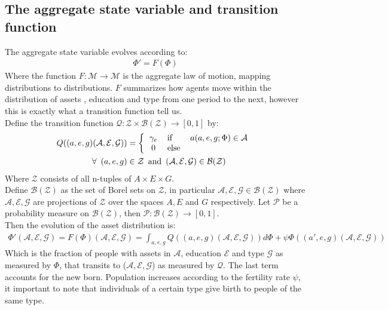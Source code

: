  \subsection*{The aggregate state variable and transition function}
\noindent The aggregate state variable evolves according to:
\begin{align}
\Phi'=F(\Phi)
\end{align} 
Where the function $F:\mathcal{M}\to\mathcal{M}$ is the aggregate law of motion, mapping distributions to distributions. $F$ summarizes how agents move within the distribution of assets , education and type from one period to the next, however this is exactly what a transition function tell us. \\
\noindent Define the transition function $\mathcal{Q}:\mathcal{Z}\times\mathcal{B(Z)}\to[0,1]$ by: 
\begin{align*}
Q((a,e,g)(\mathcal{A},\mathcal{E},\mathcal{G})) &= \left\{
\begin{tabular}{clc}
$\gamma_{e}$ & if      & $a(a,e,g;\Phi) \in \mathcal{A} $\\
0 & else & 
\end{tabular}
\right.\\
\forall \,\,\,(a,e,g)&\in\mathcal{Z}\,\,\,\mbox{and}\,\,\,(\mathcal{A,E,G})\in{\mathcal{B(Z)}}
\end{align*}
Where $\mathcal{Z}$ consists of all n-tuples of $A\times E\times G$. \\
Define $\mathcal{B(Z)}$ as the set of Borel sets on $\mathcal{Z}$, in particular $\mathcal{A,E,G}\in\mathcal{B(Z)}$ where $\mathcal{A,E,G}$ are projections of $\mathcal{Z}$ over the spaces $A,E$ and $G$ respectively. Let $\mathcal{P}$ be a probability measure on $\mathcal{B(Z)}$, then $\mathcal{P}: \mathcal{B(Z)}\to[0,1]$.\\
Then the evolution of the asset distribution is:
\begin{align}
\Phi'(\mathcal{A},\mathcal{E},\mathcal{G}) = F(\Phi) (\mathcal{A},\mathcal{E},\mathcal{G})= \int_{a,e,g} Q((a,e,g)(\mathcal{A},\mathcal{E},\mathcal{G})) d \Phi+\psi\Phi((a',e,g)(\mathcal{A},\mathcal{E},\mathcal{G}))
\end{align}
Which is the fraction of people with assets in $\mathcal{A}$, education $\mathcal{E}$ and type $\mathcal{G}$ as measured by $\Phi$, that transits to ($\mathcal{A,E,G}$) as measured by $\mathcal{Q}$. The last term accounts for the new born. Population increases according to the fertility rate $\psi$, it important to note that individuals of a certain type give birth to people of the same type.
